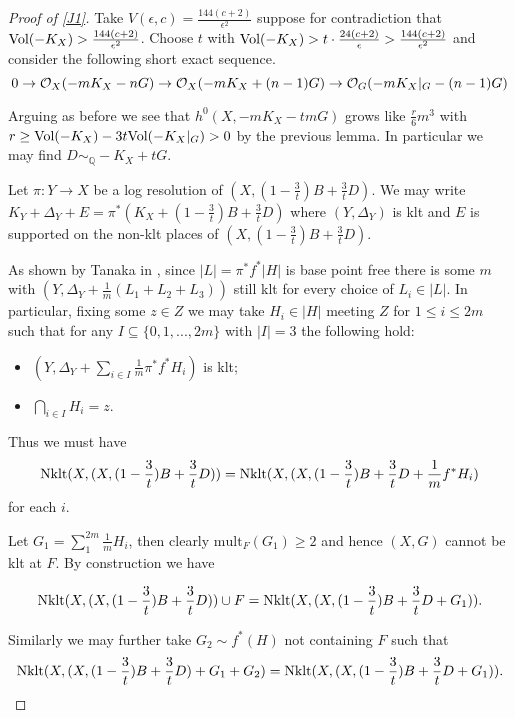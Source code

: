 \begin{proof}[Proof of \autoref{J1}]
	
	Take $V(\epsilon,c)=\frac{144(c+2)}{\epsilon^{2}}$ suppose for contradiction that $ \text{Vol}(-K_{X}) > \frac{144(c+2)}{\epsilon^{2}}$. Choose $t$ with $\text{Vol}(-K_{X})> t\cdot\frac{24(c+2)}{\epsilon} > \frac{144(c+2)}{\epsilon^{2}}$ and consider the following short exact sequence.
	\[0 \to \mathcal{O}_{X}(-mK_{X}-nG)\to \mathcal{O}_{X}(-mK_{X}+(n-1)G)\to \mathcal{O}_{G}(-mK_{X}|_{G}-(n-1)G)\]
	
	Arguing as before we see that $h^{0}(X,-mK_{X}-tmG)$ grows like $\frac{r}{6}m^{3}$ with $r\geq \text{Vol}(-K_{X})-3t\text{Vol}(-K_{X}|_{G}) >0$ by the previous lemma. In particular we may find $D \sim_{\mathbb{Q}} -K_{X}+tG$.
	
	Let $\pi\colon Y \to X$ be a log resolution of $(X, (1-\frac{3}{t})B+\frac{3}{t}D)$. We may write $K_{Y}+\Delta_{Y}+E=\pi^{*}(K_{X}+(1-\frac{3}{t})B+\frac{3}{t}D)$ where $(Y,\Delta_{Y})$ is klt and $E$ is supported on the non-klt places of $(X, (1-\frac{3}{t})B+\frac{3}{t}D)$. 
	
	As shown by Tanaka in \cite[Theorem 1]{tanaka2017semiample}, since $|L|=\pi^{*}f^{*}|H|$ is base point free there is some $m$ with $(Y,\Delta_{Y}+\frac{1}{m}(L_{1}+L_{2}+L_{3}))$	 still klt for every choice of $L_{i} \in |L|$. In particular, fixing some $z\in Z$ we may take $H_{i} \in |H|$ meeting $Z$ for $1\leq  i \leq 2m$ such that for any $I \subseteq \{0,1,...,2m\}$ with $|I| =3$ the following hold:
	
	\begin{itemize}
		\item $(Y,\Delta_{Y}+\sum_{i \in I}\frac{1}{m}\pi^{*}f^{*}H_{i})$ is klt;
		\item $\bigcap_{i\in I} H_{i}={z}$.
	\end{itemize} 
	
	Thus we must have 
	\[\text{Nklt}(X, (X, (1-\frac{3}{t})B+\frac{3}{t}D))=\text{Nklt}(X, (X, (1-\frac{3}{t})B+\frac{3}{t}D+\frac{1}{m}f^{*}H_{i})\]
	for each $i$. 
	
	Let $G_{1} = \sum_{1}^{2m} \frac{1}{m}H_{i}$, then clearly $\text{mult}_{F}(G_{1}) \geq 2$ and hence $(X,G)$ cannot be klt at $F$. By construction we have
	
	\[\text{Nklt}(X, (X, (1-\frac{3}{t})B+\frac{3}{t}D)) \cup F = \text{Nklt}(X, (X, (1-\frac{3}{t})B+\frac{3}{t}D+G_{1})).\]
	
	Similarly we may further take $G_{2} \sim f^{*}(H)$ not containing $F$ such that
	\[\text{Nklt}(X, (X, (1-\frac{3}{t})B+\frac{3}{t}D)+G_{1}+G_{2}) = \text{Nklt}(X, (X, (1-\frac{3}{t})B+\frac{3}{t}D+G_{1})).\]
	

\end{proof}
